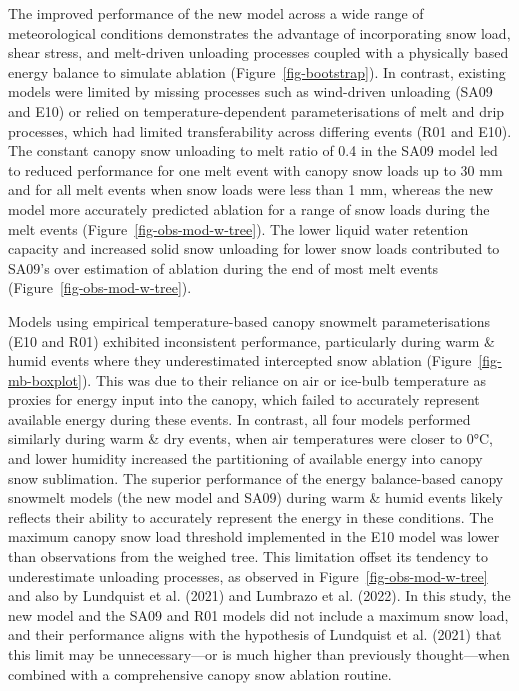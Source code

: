 \documentclass[
  letterpaper,
]{tex/uofsthesis-cs}
\begin{document}
The improved performance of the new model across a wide range of
meteorological conditions demonstrates the advantage of incorporating
snow load, shear stress, and melt-driven unloading processes coupled
with a physically based energy balance to simulate ablation
(Figure~\ref{fig-bootstrap}). In contrast, existing models were limited
by missing processes such as wind-driven unloading (SA09 and E10) or
relied on temperature-dependent parameterisations of melt and drip
processes, which had limited transferability across differing events
(R01 and E10). The constant canopy snow unloading to melt ratio of 0.4
in the SA09 model led to reduced performance for one melt event with
canopy snow loads up to 30 mm and for all melt events when snow loads
were less than 1 mm, whereas the new model more accurately predicted
ablation for a range of snow loads during the melt events
(Figure~\ref{fig-obs-mod-w-tree}). The lower liquid water retention
capacity and increased solid snow unloading for lower snow loads
contributed to SA09's over estimation of ablation during the end of most
melt events (Figure~\ref{fig-obs-mod-w-tree}).

Models using empirical temperature-based canopy snowmelt
parameterisations (E10 and R01) exhibited inconsistent performance,
particularly during warm \& humid events where they underestimated
intercepted snow ablation (Figure~\ref{fig-mb-boxplot}). This was due to
their reliance on air or ice-bulb temperature as proxies for energy
input into the canopy, which failed to accurately represent available
energy during these events. In contrast, all four models performed
similarly during warm \& dry events, when air temperatures were closer
to 0°C, and lower humidity increased the partitioning of available
energy into canopy snow sublimation. The superior performance of the
energy balance-based canopy snowmelt models (the new model and SA09)
during warm \& humid events likely reflects their ability to accurately
represent the energy in these conditions. The maximum canopy snow load
threshold implemented in the E10 model was lower than observations from
the weighed tree. This limitation offset its tendency to underestimate
unloading processes, as observed in Figure~\ref{fig-obs-mod-w-tree} and
also by Lundquist et al. (2021) and Lumbrazo et al. (2022). In this
study, the new model and the SA09 and R01 models did not include a
maximum snow load, and their performance aligns with the hypothesis of
Lundquist et al. (2021) that this limit may be unnecessary---or is much
higher than previously thought---when combined with a comprehensive
canopy snow ablation routine.
\end{document}
